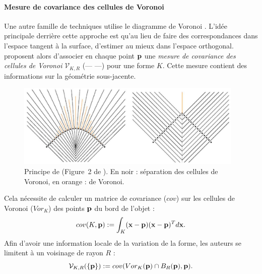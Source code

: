 \paragraph{Mesure de covariance des cellules de Voronoi}
%
Une autre famille de techniques utilise le diagramme de Voronoi
\cite{Alliez2007,Merigot2009,Merigot2011,Cuel2014DGCI}. L'idée principale
derrière cette approche est qu'au lieu de faire des correspondances dans
l'espace tangent à la surface, d'estimer au mieux dans l'espace orthogonal.
 proposent alors d'associer en chaque point $\mathbf{p}$
une \emph{mesure de covariance des cellules de Voronoi} $\mathcal{V}_{K,R}$
(\VCMM --- \VCM ---) pour une forme $K$. Cette mesure contient des informations
sur la géométrie sous-jacente.
%
%
\begin{figure}[ht]{
    \begin{center}
    \includegraphics[height=4cm]{images/Feature/VCM}
    \end{center}}
    \caption[Principe de \VCM.]{Principe de \VCM (Figure~2 de \cite{Merigot2011}). En noir : séparation des cellules de Voronoi, en orange :  de Voronoi.
      \label{fig:mellado-VCM}}
\end{figure}
%
Cela nécessite de calculer un matrice de covariance ($cov$) sur les cellules de
Voronoi ($Vor_K$) des points $\mathbf{p}$ du bord de l'objet :
%
\begin{equation}
    cov(K,\mathbf{p}) := \int_K (\mathbf{x} - \mathbf{p})(\mathbf{x} - \mathbf{p})^T d\mathbf{x} .
\end{equation}
%
Afin d'avoir une information locale de la variation de la forme, les auteurs se
limitent à un voisinage de rayon $R$ :
%
\begin{equation}
  \mathcal{V}_{K,R}(\{\mathbf{p}\}) := cov(Vor_K(\mathbf{p}) \cap B_{R}(\mathbf{p}), \mathbf{p}) .
\end{equation}
%
